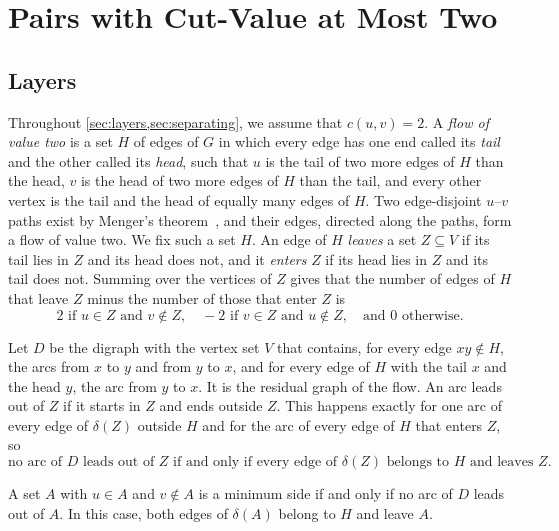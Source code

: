 \section{Pairs with Cut-Value at Most Two}
\label{sec:squares}

\subsection{Layers}
\label{sec:layers}

Throughout \cref{sec:layers,sec:separating}, we assume that $c(u, v) = 2$.
A \emph{flow of value two} is a set $H$ of edges of $G$ in which every edge has one end called its \emph{tail} and the other called its \emph{head}, such that $u$ is the tail of two more edges of $H$ than the head, $v$ is the head of two more edges of $H$ than the tail, and every other vertex is the tail and the head of equally many edges of $H$.
Two edge-disjoint $u$--$v$ paths exist by Menger's theorem~\cite[Corollary~3.3.5]{Diestel2025}, and their edges, directed along the paths, form a flow of value two.
We fix such a set $H$.
An edge of $H$ \emph{leaves} a set $Z \subseteq V$ if its tail lies in $Z$ and its head does not, and it \emph{enters} $Z$ if its head lies in $Z$ and its tail does not.
Summing over the vertices of $Z$ gives that the number of edges of $H$ that leave $Z$ minus the number of those that enter $Z$ is
\begin{equation}
\label{eq:balance}
2 \text{ if } u \in Z \text{ and } v \notin Z, \quad -2 \text{ if } v \in Z \text{ and } u \notin Z, \quad \text{and } 0 \text{ otherwise.}
\end{equation}

Let $D$ be the digraph with the vertex set $V$ that contains, for every edge $xy \notin H$, the arcs from $x$ to $y$ and from $y$ to $x$, and for every edge of $H$ with the tail $x$ and the head $y$, the arc from $y$ to $x$.
It is the residual graph of the flow.
An arc leads out of $Z$ if it starts in $Z$ and ends outside $Z$.
This happens exactly for one arc of every edge of $\delta(Z)$ outside $H$ and for the arc of every edge of $H$ that enters $Z$, so
\begin{equation}
\label{eq:closed}
\text{no arc of } D \text{ leads out of } Z \text{ if and only if every edge of } \delta(Z) \text{ belongs to } H \text{ and leaves } Z.
\end{equation}

\begin{lemma}
\label{lem:residual}
A set $A$ with $u \in A$ and $v \notin A$ is a minimum side if and only if no arc of $D$ leads out of $A$.
In this case, both edges of $\delta(A)$ belong to $H$ and leave $A$.
\end{lemma}

